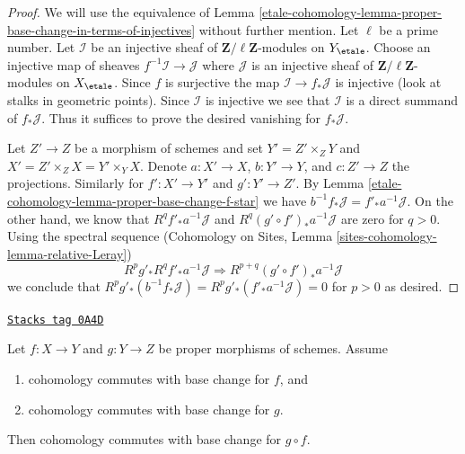 \begin{proof}
We will use the equivalence of
Lemma \ref{etale-cohomology-lemma-proper-base-change-in-terms-of-injectives}
without further mention. Let $\ell$ be a prime number.
Let $\mathcal{I}$ be an injective sheaf of
$\mathbf{Z}/\ell\mathbf{Z}$-modules on $Y_\etale$.
Choose an injective map of sheaves $f^{-1}\mathcal{I} \to \mathcal{J}$
where $\mathcal{J}$ is an injective sheaf of
$\mathbf{Z}/\ell\mathbf{Z}$-modules on $X_\etale$.
Since $f$ is surjective the map $\mathcal{I} \to f_*\mathcal{J}$
is injective (look at stalks in geometric points).
Since $\mathcal{I}$ is injective we see that $\mathcal{I}$
is a direct summand of $f_*\mathcal{J}$. Thus it suffices
to prove the desired vanishing for $f_*\mathcal{J}$.

\medskip\noindent
Let $Z' \to Z$ be a morphism of schemes and set
$Y' = Z' \times_Z Y$ and $X' = Z' \times_Z X = Y' \times_ Y X$.
Denote $a : X' \to X$, $b : Y' \to Y$, and $c : Z' \to Z$ the
projections. Similarly for $f' : X' \to Y'$ and $g' : Y' \to Z'$.
By Lemma \ref{etale-cohomology-lemma-proper-base-change-f-star} we have
$b^{-1}f_*\mathcal{J} = f'_*a^{-1}\mathcal{J}$.
On the other hand, we know that $R^qf'_*a^{-1}\mathcal{J}$ and
$R^q(g' \circ f')_*a^{-1}\mathcal{J}$ are zero for $q > 0$.
Using the spectral sequence
(Cohomology on Sites, Lemma \ref{sites-cohomology-lemma-relative-Leray})
$$
R^pg'_* R^qf'_* a^{-1}\mathcal{J} \Rightarrow
R^{p + q}(g' \circ f')_* a^{-1}\mathcal{J}
$$
we conclude that
$ R^pg'_*(b^{-1}f_*\mathcal{J}) = R^pg'_*(f'_*a^{-1}\mathcal{J}) = 0$
for $p > 0$ as desired.
\end{proof}

\begin{lemma}[Composition]
\label{etale-cohomology-lemma-composition}
\href{https://stacks.math.columbia.edu/tag/0A4D}{\texttt{Stacks tag 0A4D}}

Let $f : X \to Y$ and $g : Y \to Z$ be proper morphisms of schemes. Assume
\begin{enumerate}
\item cohomology commutes with base change for $f$, and
\item cohomology commutes with base change for $g$.
\end{enumerate}
Then cohomology commutes with base change for $g \circ f$.
\end{lemma}

